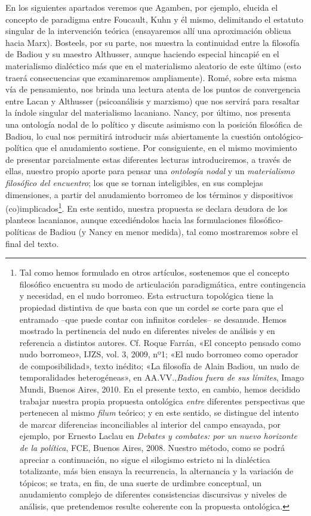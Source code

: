 En los siguientes apartados veremos que Agamben, por ejemplo, elucida el concepto de paradigma entre Foucault, Kuhn y él mismo, delimitando el estatuto singular de la intervención teórica (ensayaremos allí una aproximación oblicua hacia Marx). Bosteels, por su parte, nos muestra la continuidad entre la filosofía de Badiou y su maestro Althusser, aunque haciendo especial hincapié en el materialismo dialéctico más que en el materialismo aleatorio de este último (esto traerá consecuencias que examinaremos ampliamente). Romé, sobre esta misma vía de pensamiento, nos brinda una lectura atenta de los puntos de convergencia entre Lacan y Althusser (psicoanálisis y marxismo) que nos servirá para resaltar la índole singular del materialismo lacaniano. Nancy, por último, nos presenta una ontología nodal de lo político y discute asimismo con la posición filosófica de Badiou, lo cual nos permitirá introducir más abiertamente la cuestión ontológico-política que el anudamiento sostiene. Por consiguiente, en el mismo movimiento de presentar parcialmente estas diferentes lecturas introduciremos, a través de ellas, nuestro propio aporte para pensar una \emph{ontología nodal} y un \emph{materialismo filosófico del encuentro}; los que se tornan inteligibles, en sus complejas dimensiones, a partir del anudamiento borromeo de los términos y dispositivos (co)implicados\footnote{Tal como hemos formulado en otros artículos, sostenemos que el concepto filosófico encuentra su modo de articulación paradigmática, entre contingencia y necesidad, en el nudo borromeo. Esta estructura topológica tiene la propiedad distintiva de que basta con que un cordel se corte para que el entramado --que puede contar con infinitos cordeles-- se desanude. Hemos mostrado la pertinencia del nudo en diferentes niveles de análisis y en referencia a distintos autores. Cf. Roque Farrán, «El concepto pensado como nudo borromeo», IJZS, vol. 3, 2009, nº1; «El nudo borromeo como operador de composibilidad», texto inédito; «La filosofía de Alain Badiou, un nudo de temporalidades heterogéneas», en AA.VV.,\emph{Badiou fuera de sus límites}, Imago Mundi, Buenos Aires, 2010. En el presente texto, en cambio, hemos decidido trabajar nuestra propia propuesta ontológica \emph{entre} diferentes perspectivas que pertenecen al mismo \emph{filum} teórico; y en este sentido, se distingue del intento de marcar diferencias inconciliables al interior del campo ensayada, por ejemplo, por Ernesto Laclau en \emph{Debates y combates: por un nuevo horizonte de la política}, FCE, Buenos Aires, 2008. Nuestro método, como se podrá apreciar a continuación, no sigue el silogismo estricto ni la dialéctica totalizante, más bien ensaya la recurrencia, la alternancia y la variación de tópicos; se trata, en fin, de una suerte de urdimbre conceptual, un anudamiento complejo de diferentes consistencias discursivas y niveles de análisis, que pretendemos resulte coherente con la propuesta ontológica.}. En este sentido, nuestra propuesta se declara deudora de los planteos lacanianos, aunque excediéndolos hacia las formulaciones filosófico-políticas de Badiou (y Nancy en menor medida), tal como mostraremos sobre el final del texto.

